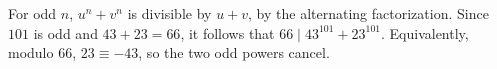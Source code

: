 For odd $n$, $u^n+v^n$ is divisible by $u+v$, by the alternating factorization. Since $101$ is odd and $43+23=66$, it follows that $\boxed{66\mid43^{101}+23^{101}}$. Equivalently, modulo $66$, $23\equiv-43$, so the two odd powers cancel.
